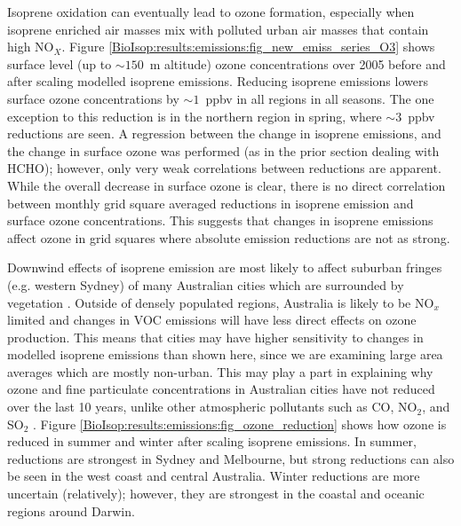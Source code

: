       Isoprene oxidation can eventually lead to ozone formation, especially when isoprene enriched air masses mix with polluted urban air masses that contain high NO$_X$.
      Figure \ref{BioIsop:results:emissions:fig_new_emiss_series_O3} shows surface level (up to $\sim{150}$~m altitude) ozone concentrations over 2005 before and after scaling modelled isoprene emissions.
      Reducing isoprene emissions lowers surface ozone concentrations by $\sim1$~ppbv in all regions in all seasons.
      The one exception to this reduction is in the northern region in spring, where $\sim3$~ppbv reductions are seen.
      A regression between the change in isoprene emissions, and the change in surface ozone was performed (as in the prior section dealing with HCHO); however, only very weak correlations between reductions are apparent.
      While the overall decrease in surface ozone is clear, there is no direct correlation between monthly grid square averaged reductions in isoprene emission and surface ozone concentrations.
      This suggests that changes in isoprene emissions affect ozone in grid squares where absolute emission reductions are not as strong.
      
      
      
      Downwind effects of isoprene emission are most likely to affect suburban fringes (e.g. western Sydney) of many Australian cities which are surrounded by vegetation \parencite{Millet2016}.
      Outside of densely populated regions, Australia is likely to be NO$_x$ limited and changes in VOC emissions will have less direct effects on ozone production.
      This means that cities may have higher sensitivity to changes in modelled isoprene emissions than shown here, since we are examining large area averages which are mostly non-urban.
      This may play a part in explaining why ozone and fine particulate concentrations in Australian cities have not reduced over the last 10 years, unlike other atmospheric pollutants such as CO, NO$_2$, and SO$_2$ \parencite{SOE2016}.
      Figure \ref{BioIsop:results:emissions:fig_ozone_reduction} shows how ozone is reduced in summer and winter after scaling isoprene emissions.
      In summer, reductions are strongest in Sydney and Melbourne, but strong reductions can also be seen in the west coast and central Australia.
      Winter reductions are more uncertain (relatively); however, they are strongest in the coastal and oceanic regions around Darwin.
      
